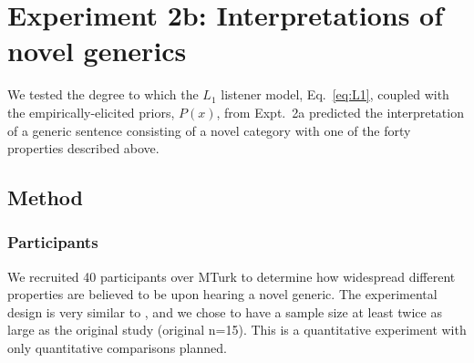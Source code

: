 \documentclass[12pt,letterpaper]{article}
\begin{document}
\section*{Experiment 2b: Interpretations of novel generics}

We tested the degree to which the $L_1$ listener model, Eq.~\ref{eq:L1}, coupled with the empirically-elicited priors, $P(x)$, from Expt.~2a predicted the interpretation of a generic sentence consisting of a novel category with one of the forty properties described above.



\subsection*{Method}

\subsubsection*{Participants}

We recruited 40 participants over MTurk to determine how widespread different properties are believed to be upon hearing a novel generic.  
The experimental design is very similar to , and we chose to have a sample size at least twice as large as the original study (original n=15). 
This is a quantitative experiment with only quantitative comparisons planned.
\end{document}
